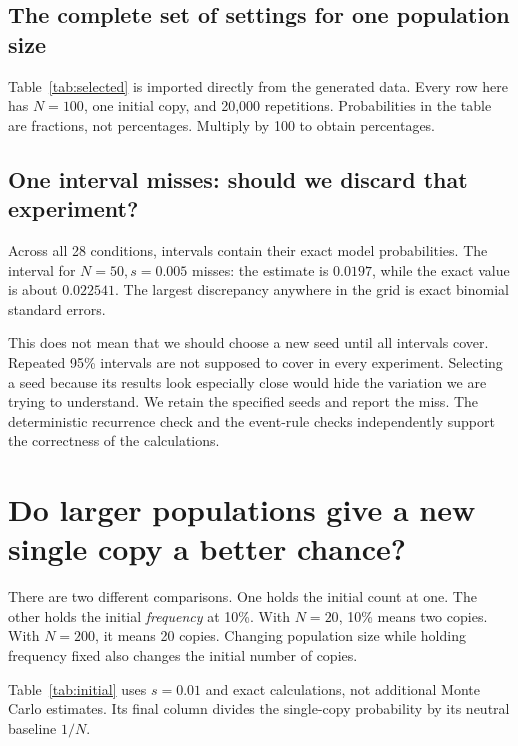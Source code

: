 \subsection{The complete set of settings for one population size}
Table~\ref{tab:selected} is imported directly from the generated data. Every row here has \(N=100\), one initial copy, and 20,000 repetitions. Probabilities in the table are fractions, not percentages. Multiply by 100 to obtain percentages.

\begin{table}[htbp]
\centering\small

\caption{The supplied full run for \(N=100\). Rounding in the printed table does not affect the calculations, which retain more digits in the CSV.}
\label{tab:selected}
\end{table}

\subsection{One interval misses: should we discard that experiment?}
Across all 28 conditions, \IntervalsCovering{} intervals contain their exact model probabilities. The interval for \(N=50,s=0.005\) misses: the estimate is \(0.0197\), while the exact value is about \(0.022541\). The largest discrepancy anywhere in the grid is \MaximumStandardisedError{} exact binomial standard errors.

This does not mean that we should choose a new seed until all intervals cover. Repeated 95\% intervals are not supposed to cover in every experiment. Selecting a seed because its results look especially close would hide the variation we are trying to understand. We retain the specified seeds and report the miss. The deterministic recurrence check and the event-rule checks independently support the correctness of the calculations.

\section{Do larger populations give a new single copy a better chance?}
There are two different comparisons. One holds the initial count at one. The other holds the initial \emph{frequency} at 10\%. With \(N=20\), 10\% means two copies. With \(N=200\), it means 20 copies. Changing population size while holding frequency fixed also changes the initial number of copies.

Table~\ref{tab:initial} uses \(s=0.01\) and exact calculations, not additional Monte Carlo estimates. Its final column divides the single-copy probability by its neutral baseline \(1/N\).

